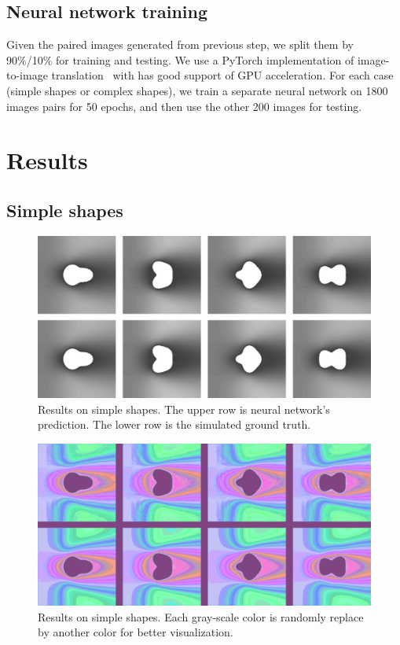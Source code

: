 \documentclass[12pt]{article}
\begin{document}
\subsection{Neural network training}

Given the paired images generated from previous step, we split them by 
90\%/10\% for training and testing.
We use a PyTorch implementation of image-to-image translation~\cite{pix2pix} 
with has good support of GPU acceleration.
For each case (simple shapes or complex shapes), we train a separate neural 
network on 1800 images pairs for 50 epochs, and then use the other 200 images 
for testing.

\section{Results}

\subsection{Simple shapes}

\begin{figure}[p]
 \centering
 \includegraphics[width=\textwidth]{result.png}
 \caption{Results on simple shapes. The upper row is neural network's 
prediction. The lower row is the simulated ground truth.}
 \label{fig:result1}
\end{figure}

\begin{figure}[p]
 \centering
 \includegraphics[width=\textwidth]{result-color.png}
 \caption{Results on simple shapes. Each gray-scale color is randomly replace 
by another color for better visualization.}
 \label{fig:result1c}
\end{figure}
\end{document}

